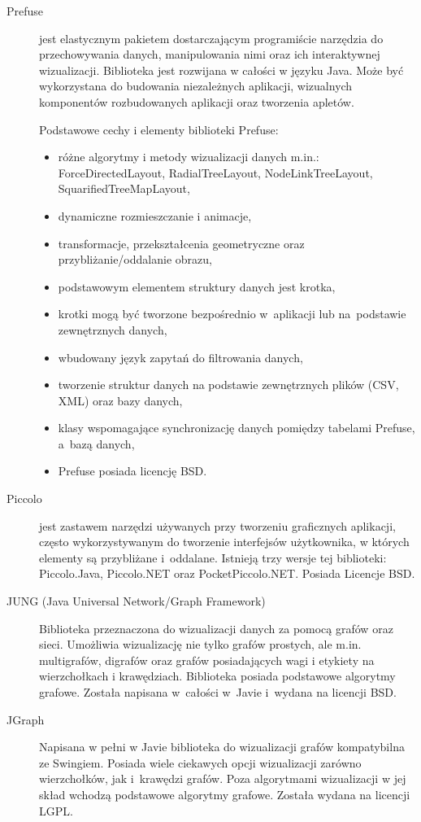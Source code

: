 \begin{description}
\item[Prefuse \cite{prefuse,prefuse_sdj}]
 jest elastycznym pakietem dostarczającym programiście narzędzia do przechowywania danych, manipulowania nimi oraz ich interaktywnej wizualizacji. Biblioteka jest 
rozwijana w całości w języku Java. Może być wykorzystana do budowania niezależnych aplikacji, wizualnych komponentów rozbudowanych aplikacji oraz tworzenia apletów.

\pagebreak[3]
Podstawowe cechy i elementy biblioteki Prefuse:
\nopagebreak[4]
\begin{itemize}
\item różne algorytmy i metody wizualizacji danych m.in.: ForceDirectedLayout, RadialTreeLayout, NodeLinkTreeLayout, SquarifiedTreeMapLayout,
\item dynamiczne rozmieszczanie i animacje,
\item transformacje, przekształcenia geometryczne oraz przybliżanie/oddalanie obrazu,
\item podstawowym elementem struktury danych jest krotka,
\item krotki mogą być tworzone bezpośrednio w~aplikacji lub na~podstawie zewnętrznych danych,
\item wbudowany język zapytań do filtrowania danych,
\item tworzenie struktur danych na podstawie zewnętrznych plików (CSV, XML) oraz bazy danych,
\item klasy wspomagające synchronizację danych pomiędzy tabelami Prefuse, a~bazą danych,
\item Prefuse posiada licencję BSD.
\end{itemize}

 \item[Piccolo]  
 jest zastawem narzędzi używanych przy tworzeniu graficznych aplikacji, często wykorzystywanym do tworzenie interfejsów użytkownika, w których elementy 
są przybliżane i~oddalane. Istnieją trzy wersje tej biblioteki: Piccolo.Java, Piccolo.NET oraz PocketPiccolo.NET. Posiada Licencje BSD.

\item[JUNG (Java Universal Network/Graph Framework)]
 Biblioteka przeznaczona do wizualizacji danych za pomocą grafów oraz sieci. Umożliwia wizualizację nie tylko grafów prostych, ale m.in. multigrafów, 
digrafów oraz grafów posiadających wagi i etykiety na wierzchołkach i krawędziach. Biblioteka posiada podstawowe algorytmy grafowe. Została napisana w~całości w~Javie 
i~wydana na licencji BSD.
\item[JGraph]

 Napisana w pełni w Javie biblioteka do wizualizacji grafów kompatybilna ze Swingiem. Posiada wiele ciekawych opcji wizualizacji zarówno wierzchołków,
 jak i~krawędzi grafów. Poza algorytmami wizualizacji w jej skład wchodzą podstawowe algorytmy grafowe. Została wydana na licencji LGPL.
\end{description}

